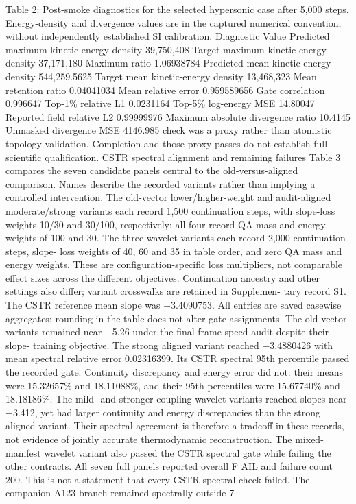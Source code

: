 \documentclass[11pt]{article}
\begin{document}
Table 2: Post-smoke diagnostics for the selected hypersonic case after 5,000 steps. Energy-density
and divergence values are in the captured numerical convention, without independently established
SI calibration.
Diagnostic Value
Predicted maximum kinetic-energy density 39,750,408
Target maximum kinetic-energy density 37,171,180
Maximum ratio 1.06938784
Predicted mean kinetic-energy density 544,259.5625
Target mean kinetic-energy density 13,468,323
Mean retention ratio 0.04041034
Mean relative error 0.959589656
Gate correlation 0.996647
Top-1\% relative L1 0.0231164
Top-5\% log-energy MSE 14.80047
Reported field relative L2 0.99999976
Maximum absolute divergence ratio 10.4145
Unmasked divergence MSE 4146.985
check was a proxy rather than atomistic topology validation. Completion and those proxy passes
do not establish full scientific qualification.
CSTR spectral alignment and remaining failures
Table 3 compares the seven candidate panels central to the old-versus-aligned comparison. Names
describe the recorded variants rather than implying a controlled intervention. The old-vector
lower/higher-weight and audit-aligned moderate/strong variants each record 1,500 continuation
steps, with slope-loss weights 10/30 and 30/100, respectively; all four record QA mass and energy
weights of 100 and 30. The three wavelet variants each record 2,000 continuation steps, slope-
loss weights of 40, 60 and 35 in table order, and zero QA mass and energy weights. These are
configuration-specific loss multipliers, not comparable effect sizes across the different objectives.
Continuation ancestry and other settings also differ; variant crosswalks are retained in Supplemen-
tary record S1. The CSTR reference mean slope was \ensuremath{-}3.4090753. All entries are saved casewise
aggregates; rounding in the table does not alter gate assignments.
The old vector variants remained near \ensuremath{-}5.26 under the final-frame speed audit despite their slope-
training objective. The strong aligned variant reached \ensuremath{-}3.4880426 with mean spectral relative error
0.02316399. Its CSTR spectral 95th percentile passed the recorded gate. Continuity discrepancy
and energy error did not: their means were 15.32657\% and 18.11088\%, and their 95th percentiles
were 15.67740\% and 18.18186\%.
The mild- and stronger-coupling wavelet variants reached slopes near \ensuremath{-}3.412, yet had larger
continuity and energy discrepancies than the strong aligned variant. Their spectral agreement is
therefore a tradeoff in these records, not evidence of jointly accurate thermodynamic reconstruction.
The mixed-manifest wavelet variant also passed the CSTR spectral gate while failing the other
contracts.
All seven full panels reported overall F AIL and failure count 200. This is not a statement
that every CSTR spectral check failed. The companion A123 branch remained spectrally outside
7
\end{document}
